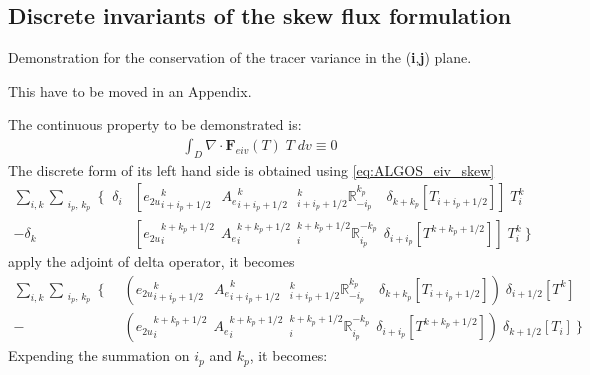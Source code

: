 \documentclass[../main/NEMO_manual]{subfiles}
\begin{document}
\subsection{Discrete invariants of the skew flux formulation}
\label{subsec:ALGOS_eiv_skew}

Demonstration for the conservation of the tracer variance in the (\textbf{i},\textbf{j}) plane.

This have to be moved in an Appendix.

The continuous property to be demonstrated is:
\begin{align*}
  \int_D \nabla \cdot \textbf{F}_{eiv}(T) \; T \;dv  \equiv 0
\end{align*}
The discrete form of its left hand side is obtained using \autoref{eq:ALGOS_eiv_skew}
\begin{align*}
  \sum\limits_{i,k} \sum_{\substack{i_p,\,k_p}}  \Biggl\{   \;\;
  \delta_i  &\left[
              {e_{2u}}_{i+i_p+1/2}^{k}                                  \;\ \ {A_{e}}_{i+i_p+1/2}^{k}
              \ \ \ { _{i+i_p+1/2}^k \mathbb{R}_{-i_p}^{k_p} }   \quad \delta_{k+k_p}[T_{i+i_p+1/2}]
              \right] \; T_i^k      \\
  - \delta_k &\left[
               {e_{2u}}_i^{k+k_p+1/2}                                     \ \ {A_{e}}_i^{k+k_p+1/2}
               \ \ { _i^{k+k_p+1/2} \mathbb{R}_{i_p}^{-k_p} }   \ \ \delta_{i+i_p}[T^{k+k_p+1/2}]
               \right] \; T_i^k      \         \Biggr\}
\end{align*}
apply the adjoint of delta operator, it becomes
\begin{align*}
  \sum\limits_{i,k} \sum_{\substack{i_p,\,k_p}}  \Biggl\{   \;\;
  &\left(
    {e_{2u}}_{i+i_p+1/2}^{k}                                  \;\ \ {A_{e}}_{i+i_p+1/2}^{k}
    \ \ \ { _{i+i_p+1/2}^k \mathbb{R}_{-i_p}^{k_p} }   \quad \delta_{k+k_p}[T_{i+i_p+1/2}]
    \right) \; \delta_{i+1/2}[T^{k}]      \\
  - &\left(
      {e_{2u}}_i^{k+k_p+1/2}                                     \ \ {A_{e}}_i^{k+k_p+1/2}
      \ \ { _i^{k+k_p+1/2} \mathbb{R}_{i_p}^{-k_p} }   \ \ \delta_{i+i_p}[T^{k+k_p+1/2}]
      \right) \; \delta_{k+1/2}[T_{i}]       \         \Biggr\}
\end{align*}
Expending the summation on $i_p$ and $k_p$, it becomes:
\end{document}
